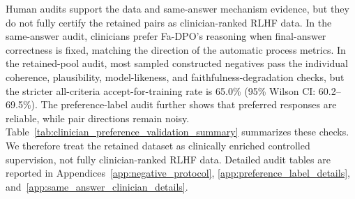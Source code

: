 \documentclass[a4paper,fleqn,doubleblind]{cas-sc}
\begin{document}
Human audits support the data and same-answer mechanism evidence, but they do not fully certify the retained pairs as clinician-ranked RLHF data. In the same-answer audit, clinicians prefer Fa-DPO's reasoning when final-answer correctness is fixed, matching the direction of the automatic process metrics. In the retained-pool audit, most sampled constructed negatives pass the individual coherence, plausibility, model-likeness, and faithfulness-degradation checks, but the stricter all-criteria accept-for-training rate is 65.0\% (95\% Wilson CI: 60.2--69.5\%). The preference-label audit further shows that preferred responses are reliable, while pair directions remain noisy. Table~\ref{tab:clinician_preference_validation_summary} summarizes these checks. We therefore treat the retained dataset as clinically enriched controlled supervision, not fully clinician-ranked RLHF data. Detailed audit tables are reported in Appendices~\ref{app:negative_protocol}, \ref{app:preference_label_details}, and~\ref{app:same_answer_clinician_details}.
\end{document}
